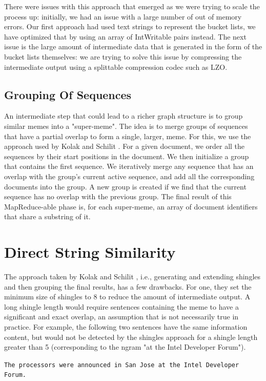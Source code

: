 \documentclass{acm_proc_article-sp}
\begin{document}
There were issues with this approach that emerged as we were trying to scale the process up: initially, we had an issue with a large number of out of memory errors. Our first approach had used text strings to represent the bucket lists, we have optimized that by using an array of IntWritable pairs instead. The next issue is the large amount of intermediate data that is generated in the form of the bucket lists themselves: we are trying to solve this issue by compressing the intermediate output using a splittable compression codec such as LZO. 

\subsection{Grouping Of Sequences}
An intermediate step that could lead to a richer graph structure is to group similar memes into a "super-meme". The idea is to merge groups of sequences that have a partial overlap to form a single, larger, meme. For this, we use the approach used by Kolak and Schilit \cite{kolak2008generating}. For a given document, we order all the sequences by their start positions in the document. We then initialize a group that contains the first sequence. We iteratively merge any sequence that has an overlap with the group's current active sequence, and add all the corresponding documents into the group. A new group is created if we find that the current sequence has no overlap with the previous group. The final result of this MapReduce-able phase is, for each super-meme, an array of document identifiers that share a substring of it.
 
\section{Direct String Similarity}
The approach taken by Kolak and Schilit  \cite{kolak2008generating}, i.e., generating and extending shingles and then grouping the final results, has a few drawbacks. For one, they set the minimum size of shingles to 8 to reduce the amount of intermediate output. A long shingle length would require sentences containing the meme to have a significant and exact overlap, an assumption that is not necessarily true in practice. For example, the following two sentences have the same information content, but would not be detected by the shingles approach for a shingle length greater than 5 (corresponding to the ngram "at the Intel Developer Forum"). 

{\tt The processors were announced in San Jose at the Intel Developer Forum.}
\end{document}
